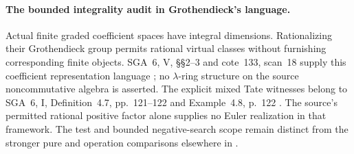 \paragraph{The  bounded integrality audit in Grothendieck's language.}
Actual finite graded coefficient spaces have
integral dimensions. Rationalizing their
Grothendieck group permits rational virtual
classes without furnishing corresponding
finite objects.
SGA~6, V, \S\S2--3 and cote~133, scan~18
supply this coefficient representation language
\cite{SGA6,Archive}; no \(\lambda\)-ring structure
on the source noncommutative algebra is asserted.
The explicit mixed Tate witnesses belong to
SGA~6, I, Definition~4.7, pp.~121--122 and
Example~4.8, p.~122 \cite{SGA6}.
The source's permitted rational positive factor
alone supplies no Euler realization in that
framework. The test and bounded negative-search
scope remain distinct from the stronger pure
and operation comparisons elsewhere in .
